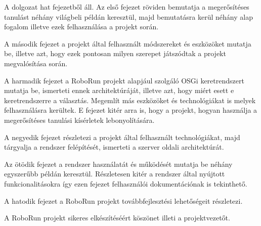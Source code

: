 	A dolgozat hat fejezetből áll. Az első fejezet röviden bemutatja a megerősítéses tanulást néhány világbeli példán keresztül, majd bemutatásra kerül néhány alap fogalom illetve ezek felhasználása a projekt során.

	A második fejezet a projekt által felhasznált módszereket és eszközöket mutatja be, illetve azt, hogy ezek pontosan milyen szerepet játszódtak a projekt megvalósítása során.	
	
	A harmadik fejezet a RoboRun projekt alapjául szolgáló OSGi keretrendszert mutatja be, ismerteti ennek architektúráját, illetve azt, hogy  miért esett e keretrendszerre a választás. Megemlít más eszközöket és technológiákat is melyek felhasználásra kerültek. E fejezet kitér arra is, hogy a projekt, hogyan használja a megerősítéses tanulási kísérletek lebonyolítására.
	
	A negyedik fejezet részletezi a projekt által felhasznált technológiákat, majd tárgyalja a rendszer felépítését, ismerteti a szerver oldali architektúrát. 
	
	Az ötödik fejezet a rendszer használatát és működését mutatja be néhány egyszerűbb példán keresztül. Részletesen kitér a rendszer által nyújtott funkcionalitásokra így ezen fejezet felhasználói dokumentációnak is tekinthető.
	
	A hatodik fejezet a RoboRun projekt továbbfejlesztési lehetőségeit részletezi.
	
	A RoboRun projekt sikeres elkészítéséért köszönet illeti a projektvezetőt.
